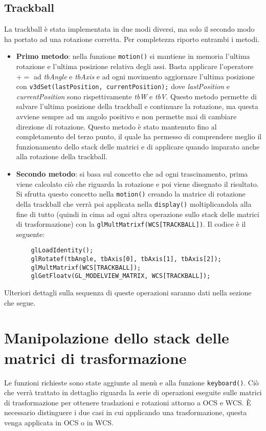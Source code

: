 \subsection{Trackball}
La trackball è stata implementata in due modi diversi, ma solo il secondo modo ha portato ad una rotazione corretta. Per completezza riporto entrambi i metodi.
\begin{itemize}
  \item \textbf{Primo metodo}: nella funzione \texttt{motion()} si mantiene in memoria l'ultima rotazione e l'ultima posizione relativa degli assi. Basta applicare l'operatore $+=$ ad \textit{tbAngle} e \textit{tbAxis} e ad ogni movimento aggiornare l'ultima posizione con \texttt{v3dSet(lastPosition,\- currentPosition);} dove \textit{lastPosition} e \textit{currentPosition} sono rispettivamente \textit{tbW} e \textit{tbV}. Questo metodo permette di salvare l'ultima posizione della trackball e continuare la rotazione, ma questa avviene sempre ad un angolo positivo e non permette mai di cambiare direzione di rotazione. Questo metodo è stato mantenuto fino al completamento del terzo punto, il quale ha permesso di comprendere meglio il funzionamento dello stack delle matrici e di applicare quando imparato anche alla rotazione della trackball.
  \item \textbf{Secondo metodo}: si basa sul concetto che ad ogni trascinamento, prima viene calcolato ciò che riguarda la rotazione e poi viene disegnato il risultato. Si sfrutta questo concetto nella \texttt{motion()} creando la matrice di rotazione della trackball che verrà poi applicata nella \texttt{display()} moltiplicandola alla fine di tutto (quindi in cima ad ogni altra operazione sullo stack delle matrici di trasformazione) con la \texttt{glMultMatrixf\-(WCS[TRACKBALL])}. Il codice è il seguente:
  \begin{lstlisting}
  	glLoadIdentity();
	glRotatef(tbAngle, tbAxis[0], tbAxis[1], tbAxis[2]);
	glMultMatrixf(WCS[TRACKBALL]);
	glGetFloatv(GL_MODELVIEW_MATRIX, WCS[TRACKBALL]);
  \end{lstlisting}
\end{itemize}
Ulteriori dettagli sulla sequenza di queste operazioni saranno dati nella sezione che segue.

\section{Manipolazione dello stack delle matrici di trasformazione}
Le funzioni richieste sono state aggiunte al menù e alla funzione \texttt{keyboard()}. Ciò che verrà trattato in dettaglio riguarda la serie di operazioni eseguite sulle matrici di trasformazione per ottenere traslazioni e rotazioni attorno a OCS e WCS. È necessario distinguere i due casi in cui applicando una trasformazione, questa venga applicata in OCS o in WCS.

